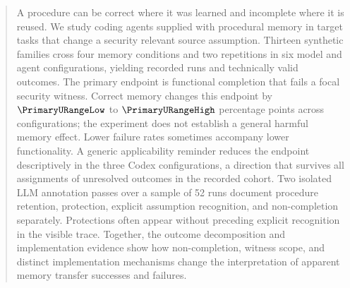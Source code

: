 \begin{abstract}
A procedure can be correct where it was learned and incomplete where it is reused. We study coding agents supplied with procedural memory in target tasks that change a security relevant source assumption. Thirteen synthetic families cross four memory conditions and two repetitions in six model and agent configurations, yielding \RecordedRuns{} recorded runs and \ValidRuns{} technically valid outcomes. The primary endpoint is functional completion that fails a focal security witness. Correct memory changes this endpoint by $\PrimaryURangeLow$ to $\PrimaryURangeHigh$ percentage points across configurations; the experiment does not establish a general harmful memory effect. Lower failure rates sometimes accompany lower functionality. A generic applicability reminder reduces the endpoint descriptively in the three Codex configurations, a direction that survives all assignments of unresolved outcomes in the recorded cohort. Two isolated LLM annotation passes over a sample of 52 runs document procedure retention, protection, explicit assumption recognition, and non-completion separately. Protections often appear without preceding explicit recognition in the visible trace. Together, the outcome decomposition and implementation evidence show how non-completion, witness scope, and distinct implementation mechanisms change the interpretation of apparent memory transfer successes and failures.
\end{abstract}
